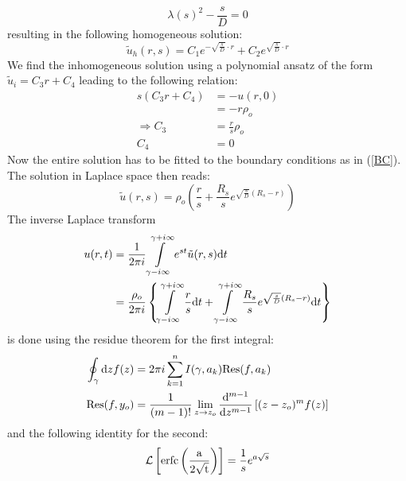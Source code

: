 \begin{equation}
    \lambda(s) ^2 - \frac{s}{D} = 0
    \label{characteristic_polynomial}
\end{equation}
resulting in the following homogeneous solution:
\begin{equation}
    \tilde{u}_h(r,s) = C_1 e^{ - \sqrt{\frac{s}{D}} \cdot r } + C_2 e^{ \sqrt{\frac{s}{D}} \cdot r }
    \label{u_h}
\end{equation}
We find the inhomogeneous solution using a polynomial ansatz of the form $\tilde{u}_i = C_3 r + C_4$ leading to the following relation:
\begin{align}
    s(C_3 r + C_4)  &= -u(r,0)\\
                    &= - r \rho_o \\
    \Rightarrow C_3 &= \frac{r}{s}\rho_o \\
                C_4 &= 0
\end{align}
Now the entire solution has to be fitted to the boundary conditions as in (\ref{BC}). The solution in Laplace space then reads:
\begin{equation}
\tilde{u}(r,s) = \rho_o \left( \frac{r}{s} + \frac{R_s}{s} e^{ \sqrt{\frac{s}{D}}(R_s - r) } \right) 
\end{equation}
The inverse Laplace transform
\begin{align}
    u(r,t)  &= \frac{1}{2 \pi i} \int\limits_{\gamma - i \infty}^{\gamma + i \infty}  e^{st} \tilde{u}(r,s){\rm d}t \\
    &= \frac{\rho_o}{ 2 \pi i} \left\{  \int\limits_{\gamma - i \infty}^{\gamma + i \infty} \frac{r}{s}  {\rm d}t +  \int\limits_{\gamma - i \infty}^{\gamma + i \infty}\frac{R_s}{s} e^{ \sqrt{\frac{s}{D}}(R_s - r) }  {\rm d}t \right\}
    \label{inverse laplace}
\end{align}
is done using the residue theorem for the first integral:
\begin{align}
    \oint_{ \gamma } {\rm d}z f(z) &= 2 \pi i \sum_{k = 1}^{n}I(\gamma, a_k) {\rm Res}(f,a_k) \\
    { \rm Res}(f,y_o) &= \frac{1}{(m-1)!} \lim_{z\rightarrow z_o} \frac{{ \rm d} ^{m-1}}{{\rm d} z^{m-1}} \left[ (z - z_o)^{m}f(z) \right]
    \label{residue theorem}
\end{align}
and the following identity for the second:
\begin{equation}
    \mathcal{L}\left[ {\rm erfc\left( \frac{a}{2\sqrt{t}} \right)} \right] = \frac{1}{s}e^{a\sqrt{s}}
    \label{L(erfc)}
\end{equation}
